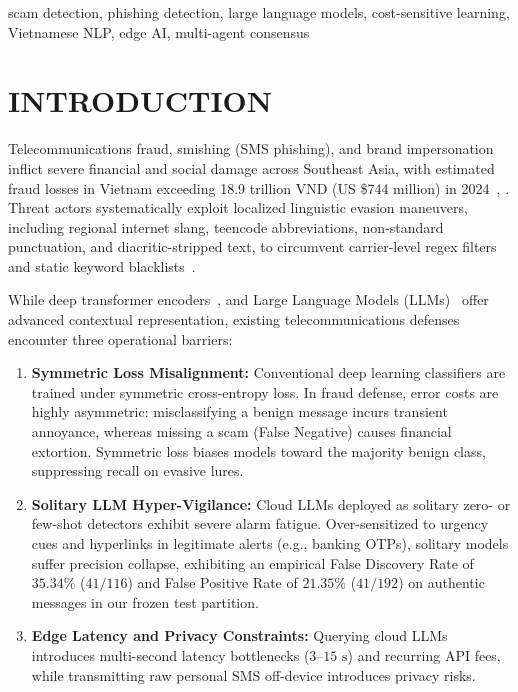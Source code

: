 \documentclass[journal]{IEEEtran}
\begin{document}
\renewcommand\IEEEkeywordsname{Keywords}
\begin{IEEEkeywords}
scam detection, phishing detection, large language models, cost-sensitive learning, Vietnamese NLP, edge AI, multi-agent consensus
\end{IEEEkeywords}

\section{INTRODUCTION}
\label{sec:intro}

Telecommunications fraud, smishing (SMS phishing), and brand impersonation inflict severe financial and social damage across Southeast Asia, with estimated fraud losses in Vietnam exceeding 18.9 trillion VND (US \$744 million) in 2024~\cite{vietnamnet2024scams}, \cite{mst2024scams}. Threat actors systematically exploit localized linguistic evasion maneuvers, including regional internet slang, teencode abbreviations, non-standard punctuation, and diacritic-stripped text, to circumvent carrier-level regex filters and static keyword blacklists~\cite{seo2024ondevice}.

While deep transformer encoders~\cite{nguyen2020phobert}, \cite{nguyen2023visobert} and Large Language Models (LLMs)~\cite{saias2025advances} offer advanced contextual representation, existing telecommunications defenses encounter three operational barriers:
\begin{enumerate}
    \item \textbf{Symmetric Loss Misalignment:} Conventional deep learning classifiers are trained under symmetric cross-entropy loss. In fraud defense, error costs are highly asymmetric: misclassifying a benign message incurs transient annoyance, whereas missing a scam (False Negative) causes financial extortion. Symmetric loss biases models toward the majority benign class, suppressing recall on evasive lures.
    \item \textbf{Solitary LLM Hyper-Vigilance:} Cloud LLMs deployed as solitary zero- or few-shot detectors exhibit severe alarm fatigue. Over-sensitized to urgency cues and hyperlinks in legitimate alerts (e.g., banking OTPs), solitary models suffer precision collapse, exhibiting an empirical False Discovery Rate of $35.34\%$ ($41/116$) and False Positive Rate of $21.35\%$ ($41/192$) on authentic messages in our frozen test partition.
    \item \textbf{Edge Latency and Privacy Constraints:} Querying cloud LLMs introduces multi-second latency bottlenecks ($3\text{--}15\text{ s}$) and recurring API fees, while transmitting raw personal SMS off-device introduces privacy risks.
\end{enumerate}
\end{document}
